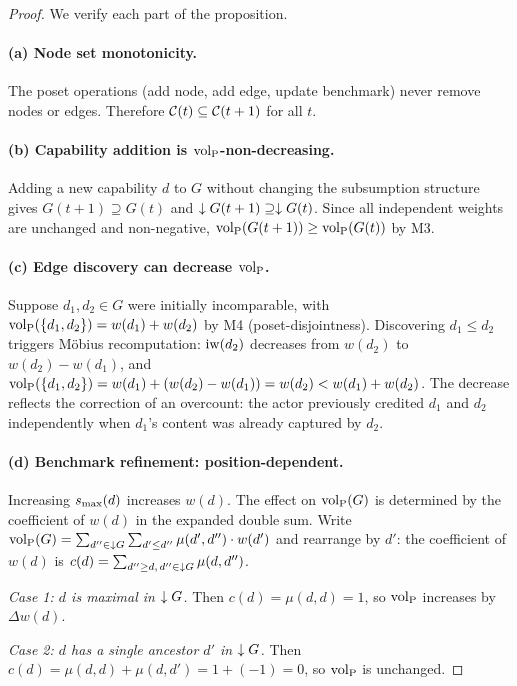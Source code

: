\begin{proof}
We verify each part of the proposition.

\paragraph{(a) Node set monotonicity.} The poset operations (add node, add
edge, update benchmark) never remove nodes or edges. Therefore $\mathcal{C}(t)
\subseteq \mathcal{C}(t+1)$ for all $t$.

\paragraph{(b) Capability addition is ${\operatorname{vol}_{\mathrm{P}}}$-non-decreasing.} Adding a new
capability $d$ to $G$ without changing the subsumption structure gives
$G(t+1) \supseteq G(t)$ and $\downarrow G(t+1) \supseteq \downarrow G(t)$. Since all
independent weights are unchanged and non-negative, ${\operatorname{vol}_{\mathrm{P}}}(G(t+1)) \geq
{\operatorname{vol}_{\mathrm{P}}}(G(t))$ by M3.

\paragraph{(c) Edge discovery can decrease ${\operatorname{vol}_{\mathrm{P}}}$.} Suppose $d_1, d_2 \in G$
were initially incomparable, with ${\operatorname{vol}_{\mathrm{P}}}(\{d_1, d_2\}) = w(d_1) + w(d_2)$ by
M4 (poset-disjointness). Discovering $d_1 \leq d_2$ triggers M\"{o}bius
recomputation: $\operatorname{iw}(d_2)$ decreases from $w(d_2)$ to $w(d_2) - w(d_1)$, and
${\operatorname{vol}_{\mathrm{P}}}(\{d_1, d_2\}) = w(d_1) + (w(d_2) - w(d_1)) = w(d_2) < w(d_1) +
w(d_2)$. The decrease reflects the correction of an overcount: the actor
previously credited $d_1$ and $d_2$ independently when $d_1$'s content was
already captured by $d_2$.

\paragraph{(d) Benchmark refinement: position-dependent.} Increasing
$s_{\mathrm{max}}(d)$ increases $w(d)$. The effect on ${\operatorname{vol}_{\mathrm{P}}}(G)$ is determined by the
coefficient of $w(d)$ in the expanded double sum. Write ${\operatorname{vol}_{\mathrm{P}}}(G) =
\sum_{d'' \in \downarrow G} \sum_{d' \leq d''} \mu(d', d'') \cdot w(d')$ and
rearrange by $d'$: the coefficient of $w(d)$ is
$c(d) = \sum_{d'' \geq d,\, d'' \in \downarrow G} \mu(d, d'')$.

\emph{Case 1: $d$ is maximal in $\downarrow G$.} Then $c(d) = \mu(d, d) = 1$, so
${\operatorname{vol}_{\mathrm{P}}}$ increases by $\Delta w(d)$.

\emph{Case 2: $d$ has a single ancestor $d'$ in $\downarrow G$.} Then $c(d) =
\mu(d, d) + \mu(d, d') = 1 + (-1) = 0$, so ${\operatorname{vol}_{\mathrm{P}}}$ is unchanged.


\end{proof}
